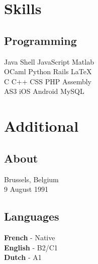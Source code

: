\documentclass[letterpaper]{my-resume} %
\begin{document}
\begin{minipage}[t]{0.33\textwidth}
\sectionspace %


\section{Skills}

\subsection{Programming}

Java \textbullet{} Shell \textbullet{} JavaScript \textbullet{} Matlab \\
OCaml \textbullet{} Python \textbullet{} Rails \textbullet{} \LaTeX\ \\ 
C \textbullet{} C++ \textbullet{} CSS \textbullet{} PHP \textbullet{} Assembly \\
AS3 \textbullet{} iOS \textbullet{} Android \textbullet{} MySQL

\sectionspace %


\section{Additional}

\subsection{About}

Brussels, Belgium \\
9 August 1991 

\sectionspace %


\subsection{Languages}

\textbf{French} - Native \\
\textbf{English} - B2/C1 \\
\textbf{Dutch} - A1

\sectionspace %


\end{minipage} %
\end{document}
